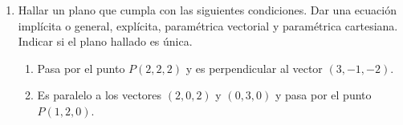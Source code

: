 \documentclass[a4paper]{article}
\newcommand{\answer}{\item[**]}
\newcommand{\exercise}{\item}
\begin{document}
\begin{enumerate}
\begin{enumerate} [label=(\alph*)]
		\item Es perpendicular a $\pi: x+y+z-3=0$

		\item Es perpendicular a $\pi: 3x-2y+z=5$ y incluye a $P(4,1,5)$

		\item Es paralela a $\pi: 3x-2y+z=5$ y pasa por $P(4,1,5)$

		\item Es perpendicular a $r_1: \displaystyle{\frac{x+2}{2}=-y+3=\frac{z+2}{5}}$ y a $r_2: \displaystyle{x-3=\frac{2y-7}{2}=\frac{z-3}{3}}$ y contiene al punto $P(3,-3,4)$
		\answer $r: (x,y,z)=(3,-3,4)+t(-8,-1,3)$. \\ $r: \left\{\begin{matrix}x=3-8y\\y=-3-t\\z=4+3t\end{matrix}\right.$ \\ $r: \displaystyle{\frac{x-3}{-8}=\frac{y+3}{-1}=\frac{z-4}{3}}$. \\ La recta es única. Resolución por \href{https://youtu.be/KebOzsUUmq4?t=458}{Mate316}.

		\item Pasa por el origen de coordenadas, es perpendicular a $r: (x,y,z)=(1,4,1)+t(3,-5,0)$ y no incluye a $P(0,0,3)$

		\item Está contenida en el plano $\pi: 2x-3y+2z=6$ y es perpendicular a la recta $r: (x,y,z)=(2,-9,7)+t(1,-1,1)$.

		\item Es paralela a los planos $\pi_1: 2x-3y+5z=2$ y $\pi_2: -x+3y+2z=1$ e incluye al punto $P(2,1,0)$.
	\end{enumerate}

	\exercise Hallar un plano que cumpla con las siguientes condiciones. Dar una ecuación implícita o general, explícita, paramétrica vectorial y paramétrica cartesiana. Indicar si el plano hallado es única.
	\begin{enumerate} [label=(\alph*)]

		\item  Pasa por el punto $P(2,2,2)$ y es perpendicular al vector $(3,-1,-2)$.

		\item  Es paralelo a los vectores $(2,0,2)$ y $(0,3,0)$ y pasa por el punto $P(1,2,0)$.


\end{enumerate}
\end{enumerate}
\end{document}
